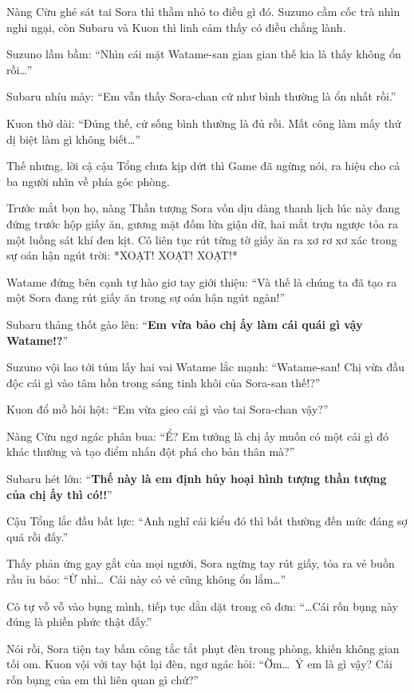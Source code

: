 \documentclass[../main.tex]{subfiles}
\begin{document}
Nàng Cừu ghé sát tai Sora thì thầm nhỏ to điều gì đó. Suzuno cầm cốc trà nhìn nghi ngại, còn Subaru và Kuon thì linh cảm thấy có điều chẳng lành.


Suzuno lầm bầm: ``Nhìn cái mặt Watame-san gian gian thế kia là thấy không ổn rồi\dots''

Subaru nhíu mày: ``Em vẫn thấy Sora-chan cứ như bình thường là ổn nhất rồi.''

Kuon thở dài: ``Đúng thế, cứ sống bình thường là đủ rồi. Mất công làm mấy thứ dị biệt làm gì không biết\dots''

Thế nhưng, lời cậ cậu Tổng chưa kịp dứt thì Game đã ngừng nói, ra hiệu cho cả ba người nhìn về phía góc phòng.

Trước mắt bọn họ, nàng Thần tượng Sora vốn dịu dàng thanh lịch lúc này đang đứng trước hộp giấy ăn, gương mặt đốm lửa giận dữ, hai mắt trợn ngược tỏa ra một luồng sát khí đen kịt. Cô liên tục rút từng tờ giấy ăn ra xơ rơ xơ xác trong sự oán hận ngút trời: *XOẠT! XOẠT! XOẠT!*

Watame đứng bên cạnh tự hào giơ tay giới thiệu: ``Và thế là chúng ta đã tạo ra một Sora đang rút giấy ăn trong sự oán hận ngút ngàn!''


Subaru thảng thốt gào lên: ``\textbf{Em vừa bảo chị ấy làm cái quái gì vậy Watame!?}''

Suzuno vội lao tới túm lấy hai vai Watame lắc mạnh: ``Watame-san! Chị vừa đầu độc cái gì vào tâm hồn trong sáng tinh khôi của Sora-san thế!?''

Kuon đổ mồ hôi hột: ``Em vừa gieo cái gì vào tai Sora-chan vậy?''

Nàng Cừu ngơ ngác phân bua: ``Ể? Em tưởng là chị ấy muốn có một cái gì đó khác thường và tạo điểm nhấn đột phá cho bản thân mà?''

Subaru hét lớn: ``\textbf{Thế này là em định hủy hoại hình tượng thần tượng của chị ấy thì có!!}''

Cậu Tổng lắc đầu bất lực: ``Anh nghĩ cái kiểu đó thì bất thường đến mức đáng sợ quá rồi đấy.''

Thấy phản ứng gay gắt của mọi người, Sora ngừng tay rút giấy, tỏa ra vẻ buồn rầu ỉu bảo: ``Ừ nhỉ\dots\ Cái này có vẻ cũng không ổn lắm\dots''

Cô tự vỗ vỗ vào bụng mình, tiếp tục dằn dặt trong cô đơn: ``\dots Cái rốn bụng này đúng là phiền phức thật đấy.''


Nói rồi, Sora tiện tay bấm công tắc tắt phụt đèn trong phòng, khiến không gian tối om. Kuon vội với tay bật lại đèn, ngơ ngác hỏi: ``Ờm\dots\ Ý em là gì vậy? Cái rốn bụng của em thì liên quan gì chứ?''
\end{document}
